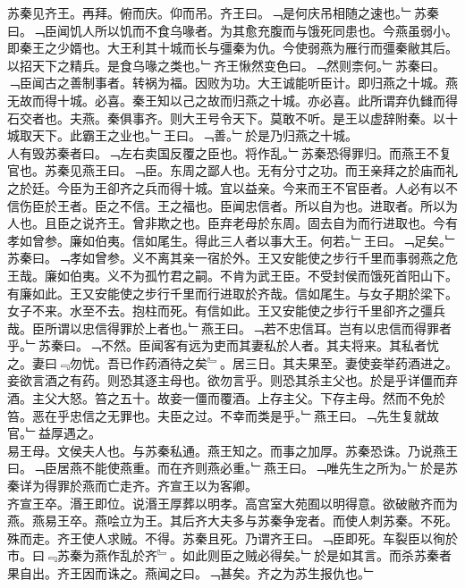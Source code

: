 \documentclass{zhvt-classic}
\begin{document}
\hspace*{2em}苏秦见齐王。再拜。俯而庆。仰而吊。齐王曰。﹁是何庆吊相随之速也。﹂苏秦曰。﹁臣闻饥人所以饥而不食乌喙者。为其愈充腹而与饿死同患也。今燕虽弱小。即秦王之少婿也。大王利其十城而长与彊秦为仇。今使弱燕为雁行而彊秦敝其后。以招天下之精兵。是食乌喙之类也。﹂齐王愀然变色曰。﹁然则柰何。﹂苏秦曰。﹁臣闻古之善制事者。转祸为福。因败为功。大王诚能听臣计。即归燕之十城。燕无故而得十城。必喜。秦王知以己之故而归燕之十城。亦必喜。此所谓弃仇雠而得石交者也。夫燕。秦俱事齐。则大王号令天下。莫敢不听。是王以虚辞附秦。以十城取天下。此霸王之业也。﹂王曰。﹁善。﹂於是乃归燕之十城。\\
\hspace*{2em}人有毁苏秦者曰。﹁左右卖国反覆之臣也。将作乱。﹂苏秦恐得罪归。而燕王不复官也。苏秦见燕王曰。﹁臣。东周之鄙人也。无有分寸之功。而王亲拜之於庙而礼之於廷。今臣为王卻齐之兵而得十城。宜以益亲。今来而王不官臣者。人必有以不信伤臣於王者。臣之不信。王之福也。臣闻忠信者。所以自为也。进取者。所以为人也。且臣之说齐王。曾非欺之也。臣弃老母於东周。固去自为而行进取也。今有孝如曾参。廉如伯夷。信如尾生。得此三人者以事大王。何若。﹂王曰。﹁足矣。﹂苏秦曰。﹁孝如曾参。义不离其亲一宿於外。王又安能使之步行千里而事弱燕之危王哉。廉如伯夷。义不为孤竹君之嗣。不肯为武王臣。不受封侯而饿死首阳山下。有廉如此。王又安能使之步行千里而行进取於齐哉。信如尾生。与女子期於梁下。女子不来。水至不去。抱柱而死。有信如此。王又安能使之步行千里卻齐之彊兵哉。臣所谓以忠信得罪於上者也。﹂燕王曰。﹁若不忠信耳。岂有以忠信而得罪者乎。﹂苏秦曰。﹁不然。臣闻客有远为吏而其妻私於人者。其夫将来。其私者忧之。妻曰﹃勿忧。吾已作药酒待之矣﹄。居三日。其夫果至。妻使妾举药酒进之。妾欲言酒之有药。则恐其逐主母也。欲勿言乎。则恐其杀主父也。於是乎详僵而弃酒。主父大怒。笞之五十。故妾一僵而覆酒。上存主父。下存主母。然而不免於笞。恶在乎忠信之无罪也。夫臣之过。不幸而类是乎。﹂燕王曰。﹁先生复就故官。﹂益厚遇之。\\
\hspace*{2em}易王母。文侯夫人也。与苏秦私通。燕王知之。而事之加厚。苏秦恐诛。乃说燕王曰。﹁臣居燕不能使燕重。而在齐则燕必重。﹂燕王曰。﹁唯先生之所为。﹂於是苏秦详为得罪於燕而亡走齐。齐宣王以为客卿。\\
\hspace*{2em}齐宣王卒。湣王即位。说湣王厚葬以明孝。高宫室大苑囿以明得意。欲破敝齐而为燕。燕易王卒。燕哙立为王。其后齐大夫多与苏秦争宠者。而使人刺苏秦。不死。殊而走。齐王使人求贼。不得。苏秦且死。乃谓齐王曰。﹁臣即死。车裂臣以徇於市。曰﹃苏秦为燕作乱於齐﹄。如此则臣之贼必得矣。﹂於是如其言。而杀苏秦者果自出。齐王因而诛之。燕闻之曰。﹁甚矣。齐之为苏生报仇也。﹂\\
\end{document}
